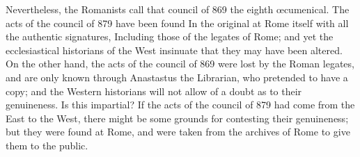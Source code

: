 Nevertheless, the Romanists call that council of 869 the eighth œcumenical. The acts of the council of 879 have been found In the original at Rome itself with all the authentic signatures, Including those of the legates of Rome; and yet the ecclesiastical historians of the West insinuate that they may have been altered. On the other hand, the acts of the council of 869 were lost by the Roman legates, and are only known through Anastastus the Librarian, who pretended to have a copy; and the Western historians will not allow of a doubt as to their genuineness. Is this impartial? If the acts of the council of 879 had come from the East to the West, there might be some grounds for contesting their genuineness; but they were found at Rome, and were taken from the archives of Rome to give them to the public.


